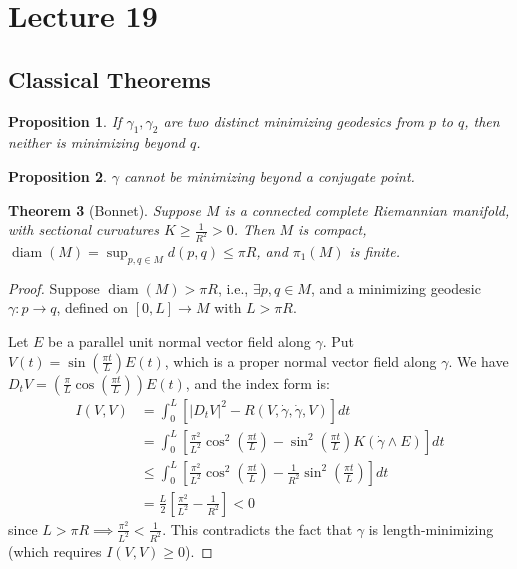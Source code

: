 \documentclass[11pt, a4paper]{article}
\theoremstyle{plain}
\newtheorem{theorem}{Theorem}[section]
\newtheorem{proposition}[theorem]{Proposition}
\theoremstyle{definition}
\theoremstyle{remark}
\DeclareMathOperator{\diam}{diam}
\begin{document}
{
    \section{Lecture 19}
    \subsection{Classical Theorems}
    \begin{proposition}
If $\gamma_1, \gamma_2$ are two distinct minimizing geodesics from $p$ to $q$, then neither is minimizing beyond $q$.
\end{proposition}

\begin{proposition}
$\gamma$ cannot be minimizing beyond a conjugate point.
\end{proposition}

\begin{theorem}[Bonnet]
Suppose $M$ is a connected complete Riemannian manifold, with sectional curvatures $K \ge \frac{1}{R^2} > 0$. Then $M$ is compact, $\diam(M) = \sup_{p,q \in M} d(p,q) \le \pi R$, and $\pi_1(M)$ is finite.
\end{theorem}

\begin{proof}
Suppose $\diam(M) > \pi R$, i.e., $\exists p, q \in M$, and a minimizing geodesic $\gamma: p \to q$, defined on $[0, L] \to M$ with $L > \pi R$.

Let $E$ be a parallel unit normal vector field along $\gamma$. Put $V(t) = \sin\left(\frac{\pi t}{L}\right) E(t)$, which is a proper normal vector field along $\gamma$.
We have $D_t V = \left(\frac{\pi}{L} \cos\left(\frac{\pi t}{L}\right)\right) E(t)$, and the index form is:
\begin{align*}
I(V, V) &= \int_0^L \left[ \left|D_t V\right|^2 - R(V, \dot{\gamma}, \dot{\gamma}, V) \right] dt \\
&= \int_0^L \left[ \frac{\pi^2}{L^2} \cos^2\left(\frac{\pi t}{L}\right) - \sin^2\left(\frac{\pi t}{L}\right) K(\dot{\gamma} \wedge E) \right] dt \\
&\le \int_0^L \left[ \frac{\pi^2}{L^2} \cos^2\left(\frac{\pi t}{L}\right) - \frac{1}{R^2} \sin^2\left(\frac{\pi t}{L}\right) \right] dt \\
&= \frac{L}{2} \left[ \frac{\pi^2}{L^2} - \frac{1}{R^2} \right] < 0
\end{align*}
since $L > \pi R \implies \frac{\pi^2}{L^2} < \frac{1}{R^2}$. This contradicts the fact that $\gamma$ is length-minimizing (which requires $I(V,V) \ge 0$).


\end{proof}}
\end{document}
